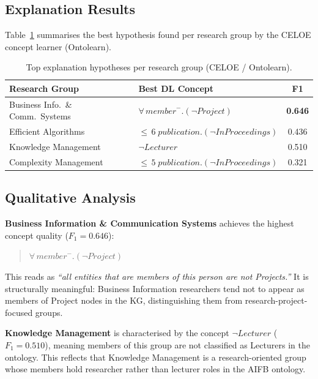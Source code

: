 \documentclass[runningheads]{llncs}
\begin{document}
\subsection{Explanation Results}

Table~\ref{tab:explanations} summarises the best hypothesis found per research group
by the CELOE concept learner (Ontolearn).

\begin{table}[ht]
\centering
\caption{Top explanation hypotheses per research group (CELOE / Ontolearn).}
\label{tab:explanations}
\begin{tabular}{p{3.8cm}p{6.5cm}c}
\toprule
\textbf{Research Group} & \textbf{Best DL Concept} & \textbf{F1} \\
\midrule
Business Info.\ \& Comm.\ Systems
  & $\forall\,\mathit{member}^{-}.(\neg\mathit{Project})$
  & \textbf{0.646} \\
Efficient Algorithms
  & ${\leq}\,6\;\mathit{publication}.(\neg\mathit{InProceedings})$
  & 0.436 \\
Knowledge Management
  & $\neg\mathit{Lecturer}$
  & 0.510 \\
Complexity Management
  & ${\leq}\,5\;\mathit{publication}.(\neg\mathit{InProceedings})$
  & 0.321 \\
\bottomrule
\end{tabular}
\end{table}

\subsection{Qualitative Analysis}

\textbf{Business Information \& Communication Systems} achieves the highest concept
quality ($F_1 = 0.646$):
\begin{quote}
$\forall\,\mathit{member}^{-}.(\neg\mathit{Project})$
\end{quote}
This reads as \emph{``all entities that are members of this person are not Projects.''}
It is structurally meaningful: Business Information researchers tend not to appear as
members of Project nodes in the KG, distinguishing them from research-project-focused groups.

\textbf{Knowledge Management} is characterised by the concept $\neg\mathit{Lecturer}$
($F_1 = 0.510$), meaning members of this group are not classified as Lecturers in the ontology.
This reflects that Knowledge Management is a research-oriented group whose members hold
researcher rather than lecturer roles in the AIFB ontology.
\end{document}
